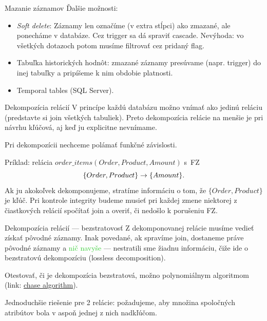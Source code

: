 \documentclass[12pt]{beamer}
\def\green#1{\textcolor{LimeGreen}{#1}}
\begin{document}
\begin{frame}[fragile]{Mazanie záznamov}
Ďalšie možnosti:
\begin{itemize}
\item {\emph{Soft delete}}: Záznamy len označíme (v extra stĺpci) ako zmazané, ale ponecháme v databáze. Cez trigger sa dá spraviť cascade.
Nevýhoda: vo všetkých dotazoch potom musíme filtrovať cez pridaný flag.
\item Tabuľka historických hodnôt: zmazané záznamy presúvame (napr. trigger) do inej tabuľky a pripíšeme k nim obdobie platnosti.
\item Temporal tables (SQL Server).
\end{itemize}
\end{frame}

\begin{frame}[fragile]{Dekompozícia relácií}
V princípe každú databázu možno vnímať ako jedinú reláciu (predstavte si join všetkých tabuliek).
Preto dekompozícia relácie na menšie je pri návrhu kľúčová, aj keď ju explicitne nevnímame.
\bigskip

Pri dekompozícii \alert{nechceme polámať funkčné závislosti}.
\bigskip

Príklad: relácia $order\_items(Order, Product, Amount)$ s~FZ
$$\{Order, Product\}\rightarrow \{Amount\}.$$
Ak ju akokoľvek dekomponujeme, stratíme informáciu o tom, že $\{Order, Product\}$ je kľúč.
Pri kontrole integrity budeme musieť pri každej zmene niektorej z čiastkových relácií spočítať join a overiť,
či nedošlo k porušeniu FZ.
\end{frame}

\begin{frame}[fragile]{Dekompozícia relácií --- bezstratovosť}
Z dekomponovanej relácie musíme vedieť získať pôvodné záznamy.
Inak povedané, ak spravíme join, dostaneme práve pôvodné záznamy a \green{nič navyše} ---
nestratili sme žiadnu informáciu, čiže ide o \alert{bezstratovú dekompozíciu} (\alert{lossless decomposition}).

\bigskip
Otestovať, či je dekompozícia bezstratová, možno polynomiálnym algoritmom
(link: \href{https://en.wikipedia.org/wiki/Chase\_(algorithm)}{chase algorithm}).

\bigskip
Jednoduchšie riešenie pre 2 relácie:
požadujeme, aby množina spoločných atribútov bola v aspoň jednej z nich nadkľúčom.
\end{frame}
\end{document}
